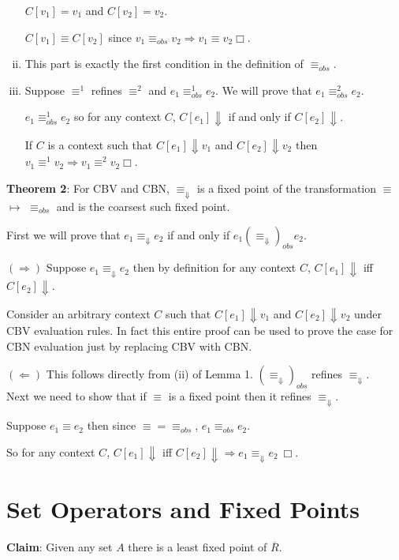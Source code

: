 \documentclass[10pt]{article}
\newcommand{\problem}[1]{\section{\sf #1}}
\begin{document}
\begin{enumerate}[(i)]
$C[v_1] = v_1$ and $C[v_2] = v_2$.

$C[v_1] \equiv C[v_2]$ since   $v_1 \equiv_{obs} v_2 \Rightarrow v_1 \equiv v_2 \Box$.
\item This part is exactly the first condition in the definition of $\equiv_{obs}$.
\item Suppose $\equiv^1$ refines $\equiv^2$ and $e_1 \equiv^1_{obs} e_2$. We will prove that $e_1 \equiv^2_{obs} e_2$.

$e_1 \equiv^1_{obs} e_2$ so for any context $C$, $C[e_1] \Downarrow$ if and only if $C[e_2] \Downarrow$.

If $C$ is a context such that $C[e_1] \Downarrow v_1$ and $C[e_2] \Downarrow v_2$ then $v_1 \equiv^1 v_2 \Rightarrow v_1 \equiv^2 v_2 \Box$.
\end{enumerate}

\textbf{Theorem 2}: For CBV and CBN, $\equiv_{\Downarrow}$ is a fixed point of the transformation $\equiv$  $\mapsto$  $\equiv_{obs}$  and is the coarsest such fixed point.

First we will prove that $e_1 \equiv_{\Downarrow} e_2$ if and only if $e_1  (\equiv_{\Downarrow})_{obs} e_2$.

$(\Rightarrow)$ Suppose  $e_1 \equiv_{\Downarrow} e_2$ then by definition for any context $C$, $C[e_1] \Downarrow$ iff $C[e_2] \Downarrow$.

Consider an arbitrary context $C$ such that $C[e_1] \Downarrow v_1$ and $C[e_2] \Downarrow v_2$ under CBV evaluation rules. In fact this entire proof can be used to prove the case for CBN evaluation just by replacing CBV with CBN.


$(\Leftarrow)$ This follows directly from (ii) of Lemma 1. $(\equiv_{\Downarrow})_{obs}$ refines $\equiv_{\Downarrow}$.\\

Next we need to show that if $\equiv$ is a fixed point then it refines $\equiv_{\Downarrow}$.

Suppose $e_1 \equiv e_2$ then since $\equiv = \equiv_{obs}$, $e_1 \equiv_{obs} e_2$. 

So for any context $C$, $C[e_1] \Downarrow$ iff $C[e_2] \Downarrow \Rightarrow e_1 \equiv_{\Downarrow} e_2~ \Box$. 


\problem{Set Operators and Fixed Points}

\textbf{Claim}: Given any set $A$ there is a least fixed point of $\overline R$.\\
\end{document}
